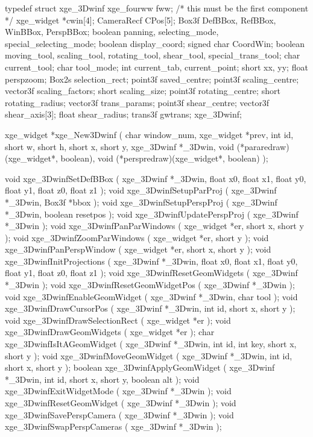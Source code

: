 \begin{listingC}
typedef struct xge_3Dwinf {
    xge_fourww  fww;         /* this must be the first component */
    xge_widget  *cwin[4];
    CameraRecf  CPos[5];
    Box3f       DefBBox, RefBBox, WinBBox, PerspBBox;
    boolean     panning, selecting_mode, special_selecting_mode;
    boolean     display_coord;
    signed char CoordWin;
    boolean     moving_tool, scaling_tool, rotating_tool, shear_tool,
                special_trans_tool;
    char        current_tool;
    char        tool_mode;
    int         current_tab, current_point;
    short       xx, yy;
    float       perspzoom;
    Box2s       selection_rect;
    point3f     saved_centre;
    point3f     scaling_centre;
    vector3f    scaling_factors;
    short       scaling_size;
    point3f     rotating_centre;
    short       rotating_radius;
    vector3f    trans_params;
    point3f     shear_centre;
    vector3f    shear_axis[3];
    float       shear_radius;
    trans3f     gwtrans;
  } xge_3Dwinf;
\end{listingC}

\begin{listingC}
xge_widget *xge_New3Dwinf ( char window_num, xge_widget *prev,
                        int id,
                        short w, short h, short x, short y,
                        xge_3Dwinf *_3Dwin,
                        void (*pararedraw)(xge_widget*, boolean),
                        void (*perspredraw)(xge_widget*, boolean) );

void xge_3DwinfSetDefBBox ( xge_3Dwinf *_3Dwin, float x0, float x1,
                            float y0, float y1, float z0, float z1 );
void xge_3DwinfSetupParProj ( xge_3Dwinf *_3Dwin, Box3f *bbox );
void xge_3DwinfSetupPerspProj ( xge_3Dwinf *_3Dwin,
                                boolean resetpos );
void xge_3DwinfUpdatePerspProj ( xge_3Dwinf *_3Dwin );
void xge_3DwinfPanParWindows ( xge_widget *er, short x, short y );
void xge_3DwinfZoomParWindows ( xge_widget *er, short y );
void xge_3DwinfPanPerspWindow ( xge_widget *er, short x, short y );
void xge_3DwinfInitProjections ( xge_3Dwinf *_3Dwin,
       float x0, float x1, float y0, float y1, float z0, float z1 );
void xge_3DwinfResetGeomWidgets ( xge_3Dwinf *_3Dwin );
void xge_3DwinfResetGeomWidgetPos ( xge_3Dwinf *_3Dwin );
void xge_3DwinfEnableGeomWidget ( xge_3Dwinf *_3Dwin, char tool );
void xge_3DwinfDrawCursorPos ( xge_3Dwinf *_3Dwin,
                               int id, short x, short y );
void xge_3DwinfDrawSelectionRect ( xge_widget *er );
void xge_3DwinfDrawGeomWidgets ( xge_widget *er );
char xge_3DwinfIsItAGeomWidget ( xge_3Dwinf *_3Dwin, int id,
                                 int key, short x, short y );
void xge_3DwinfMoveGeomWidget ( xge_3Dwinf *_3Dwin,
                                int id, short x, short y );
boolean xge_3DwinfApplyGeomWidget ( xge_3Dwinf *_3Dwin,
                        int id, short x, short y, boolean alt );
void xge_3DwinfExitWidgetMode ( xge_3Dwinf *_3Dwin );
void xge_3DwinfResetGeomWidget ( xge_3Dwinf *_3Dwin );
void xge_3DwinfSavePerspCamera ( xge_3Dwinf *_3Dwin );
void xge_3DwinfSwapPerspCameras ( xge_3Dwinf *_3Dwin );
\end{listingC}


